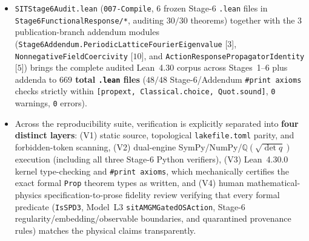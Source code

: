 \begin{itemize}
  \item \texttt{SITStage6Audit.\allowbreak{}lean} (\texttt{007-Compile}, $6$ frozen Stage-6 \texttt{.lean} files in \texttt{Stage6FunctionalResponse/*}, auditing $30/30$ theorems) together with the $3$ publication-branch addendum modules (\texttt{Stage6Addendum.\allowbreak{}PeriodicLatticeFourierEigenvalue} [$3$], \texttt{NonnegativeFieldCoercivity} [$10$], and \texttt{ActionResponsePropagatorIdentity} [$5$]) brings the complete audited Lean~4.30 corpus across Stages~1--6 plus addenda to \textbf{$669$ total \texttt{.lean} files} ($48/48$ Stage-6/Addendum \texttt{\#print axioms} checks strictly within \texttt{[propext, Classical.\allowbreak{}choice, Quot.\allowbreak{}sound]}, \texttt{0} warnings, \texttt{0} errors).
  \item Across the reproducibility suite, verification is explicitly separated into \textbf{four distinct layers}: (V1) static source, topological \texttt{lakefile.toml} parity, and forbidden-token scanning, (V2) dual-engine SymPy/NumPy/$\mathbb{Q}(\sqrt{\det q})$ execution (including all three Stage-6 Python verifiers), (V3) Lean~4.30.0 kernel type-checking and \texttt{\#print axioms}, which mechanically certifies the exact formal \texttt{Prop} theorem types as written, and (V4) human mathematical-physics specification-to-prose fidelity review verifying that every formal predicate (\texttt{IsSPD3}, Model~L3 \texttt{sitAMGMGatedOSAction}, Stage-6 regularity/embedding/observable boundaries, and quarantined provenance rules) matches the physical claims transparently.
\end{itemize}
